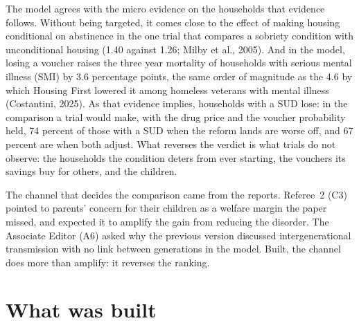 \documentclass[11pt]{article}
\begin{document}
{The model agrees with the micro evidence on the households that evidence follows. Without
being targeted, it comes close to the effect of making housing conditional on abstinence in
the one trial that compares a sobriety condition with unconditional housing (1.40 against
1.26; Milby et al., 2005). And in the model, losing a voucher raises the three year
mortality of households with serious mental illness (SMI) by 3.6 percentage points, the
same order of magnitude as the 4.6 by which Housing First lowered it among homeless
veterans with mental illness (Costantini, 2025). As that evidence implies, households with
a SUD lose: in the comparison a trial would make, with the drug price and the voucher
probability held, 74 percent of those with a SUD when the reform lands are worse off, and
67 percent are when both adjust. What reverses the verdict is what trials do not observe:
the households the condition deters from ever starting, the vouchers its savings buy for
others, and the children.

The channel that decides the comparison came from the reports. Referee~2 (C3) pointed to
parents' concern for their children as a welfare margin the paper missed, and expected it
to amplify the gain from reducing the disorder. The Associate Editor (A6) asked why the
previous version discussed intergenerational transmission with no link between
generations in the model. Built, the channel does more than amplify: it reverses the
ranking.
}

\section*{\color{respred}What was built}
\end{document}
